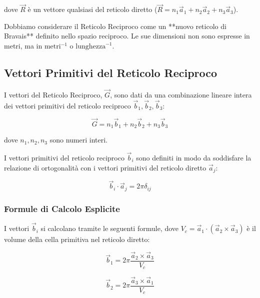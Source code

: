 dove $\vec{R}$ è un vettore qualsiasi del reticolo diretto ($\vec{R} = n_1\vec{a}_1 + n_2\vec{a}_2 + n_3\vec{a}_3$).

Dobbiamo considerare il Reticolo Reciproco come un **nuovo reticolo di Bravais** definito nello spazio reciproco. Le sue dimensioni non sono espresse in metri, ma in $\text{metri}^{-1}$ o $\text{lunghezza}^{-1}$.

\subsection{Vettori Primitivi del Reticolo Reciproco}

I vettori del Reticolo Reciproco, $\vec{G}$, sono dati da una combinazione lineare intera dei vettori primitivi del reticolo reciproco $\vec{b}_1, \vec{b}_2, \vec{b}_3$:

\vspace{1em}
\begin{equation}
\vec{G} = n_1 \vec{b}_1 + n_2 \vec{b}_2 + n_3 \vec{b}_3
\end{equation}
\vspace{1em}

dove $n_1, n_2, n_3$ sono numeri interi.

I vettori primitivi del reticolo reciproco $\vec{b}_i$ sono definiti in modo da soddisfare la relazione di ortogonalità con i vettori primitivi del reticolo diretto $\vec{a}_j$:

\vspace{1em}
\begin{equation}
\vec{b}_i \cdot \vec{a}_j = 2\pi \delta_{i j}
\end{equation}
\vspace{1em}

\subsubsection{Formule di Calcolo Esplicite}
I vettori $\vec{b}_i$ si calcolano tramite le seguenti formule, dove $V_c = \vec{a}_1 \cdot (\vec{a}_2 \times \vec{a}_3)$ è il volume della cella primitiva nel reticolo diretto:

\vspace{1em}
\begin{equation}
\vec{b}_1 = 2\pi \frac{\vec{a}_2 \times \vec{a}_3}{V_c}
\end{equation}
\vspace{1em}

\vspace{1em}
\begin{equation}
\vec{b}_2 = 2\pi \frac{\vec{a}_3 \times \vec{a}_1}{V_c}
\end{equation}
\vspace{1em}

